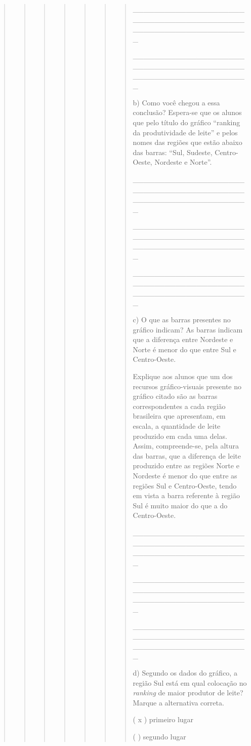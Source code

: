 \begin{quote}
\begin{quote}
\begin{quote}
\begin{quote}
\begin{quote}
\begin{quote}
\begin{quote}
\_\_\_\_\_\_\_\_\_\_\_\_\_\_\_\_\_\_\_\_\_\_\_\_\_\_\_\_\_\_\_\_\_\_\_\_\_\_\_\_\_\_\_\_\_\_\_\_\_\_\_\_\_\_\_\_\_\_\_\_\_\_\_\_

\_\_\_\_\_\_\_\_\_\_\_\_\_\_\_\_\_\_\_\_\_\_\_\_\_\_\_\_\_\_\_\_\_\_\_\_\_\_\_\_\_\_\_\_\_\_\_\_\_\_\_\_\_\_\_\_\_\_\_\_\_\_\_\_

b) Como você chegou a essa conclusão? Espera-se que os alunos que pelo
título do gráfico ``ranking da produtividade de leite'' e pelos nomes
das regiões que estão abaixo das barras: ``Sul, Sudeste, Centro-Oeste,
Nordeste e Norte''.

\_\_\_\_\_\_\_\_\_\_\_\_\_\_\_\_\_\_\_\_\_\_\_\_\_\_\_\_\_\_\_\_\_\_\_\_\_\_\_\_\_\_\_\_\_\_\_\_\_\_\_\_\_\_\_\_\_\_\_\_\_\_\_\_

\_\_\_\_\_\_\_\_\_\_\_\_\_\_\_\_\_\_\_\_\_\_\_\_\_\_\_\_\_\_\_\_\_\_\_\_\_\_\_\_\_\_\_\_\_\_\_\_\_\_\_\_\_\_\_\_\_\_\_\_\_\_\_\_

\_\_\_\_\_\_\_\_\_\_\_\_\_\_\_\_\_\_\_\_\_\_\_\_\_\_\_\_\_\_\_\_\_\_\_\_\_\_\_\_\_\_\_\_\_\_\_\_\_\_\_\_\_\_\_\_\_\_\_\_\_\_\_\_

c) O que as barras presentes no gráfico indicam? As barras indicam que a
diferença entre Nordeste e Norte é menor do que entre Sul e
Centro-Oeste.

Explique aos alunos que um dos recursos gráfico-visuais presente no
gráfico citado são as barras correspondentes a cada região brasileira
que apresentam, em escala, a quantidade de leite produzido em cada uma
delas. Assim, compreende-se, pela altura das barras, que a diferença de
leite produzido entre as regiões Norte e Nordeste é menor do que entre
as regiões Sul e Centro-Oeste, tendo em vista a barra referente à região
Sul é muito maior do que a do Centro-Oeste.

\_\_\_\_\_\_\_\_\_\_\_\_\_\_\_\_\_\_\_\_\_\_\_\_\_\_\_\_\_\_\_\_\_\_\_\_\_\_\_\_\_\_\_\_\_\_\_\_\_\_\_\_\_\_\_\_\_\_\_\_\_\_\_\_

\_\_\_\_\_\_\_\_\_\_\_\_\_\_\_\_\_\_\_\_\_\_\_\_\_\_\_\_\_\_\_\_\_\_\_\_\_\_\_\_\_\_\_\_\_\_\_\_\_\_\_\_\_\_\_\_\_\_\_\_\_\_\_\_

\_\_\_\_\_\_\_\_\_\_\_\_\_\_\_\_\_\_\_\_\_\_\_\_\_\_\_\_\_\_\_\_\_\_\_\_\_\_\_\_\_\_\_\_\_\_\_\_\_\_\_\_\_\_\_\_\_\_\_\_\_\_\_\_

d) Segundo os dados do gráfico, a região Sul está em qual colocação no
\emph{ranking} de maior produtor de leite? Marque a alternativa correta.

( x ) primeiro lugar

( ) segundo lugar


\end{quote}
\end{quote}
\end{quote}
\end{quote}
\end{quote}
\end{quote}
\end{quote}
